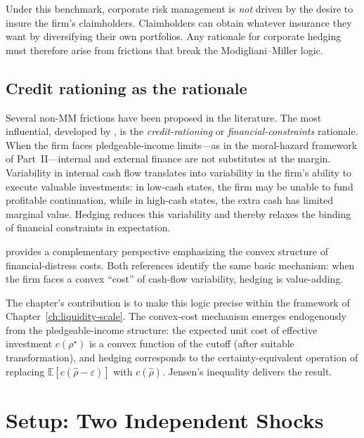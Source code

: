 \documentclass[11pt,a4paper,oneside]{book}
\def\E{\mathbb{E}}
\theoremstyle{plain}
\theoremstyle{definition}
\theoremstyle{remark}
\numberwithin{equation}{chapter}
\begin{document}
Under this benchmark, corporate risk management is \emph{not} driven by the desire to insure the firm's claimholders.
Claimholders can obtain whatever insurance they want by diversifying their own portfolios.
Any rationale for corporate hedging must therefore arise from frictions that break the Modigliani--Miller logic.

\subsection{Credit rationing as the rationale}

Several non-MM frictions have been proposed in the literature.
The most influential, developed by \citet{FrootScharfsteinStein1993}, is the \emph{credit-rationing} or \emph{financial-constraints} rationale.
When the firm faces pledgeable-income limits---as in the moral-hazard framework of Part~II---internal and external finance are not substitutes at the margin.
Variability in internal cash flow translates into variability in the firm's ability to execute valuable investments: in low-cash states, the firm may be unable to fund profitable continuation, while in high-cash states, the extra cash has limited marginal value.
Hedging reduces this variability and thereby relaxes the binding of financial constraints in expectation.

\citet{Stulz1984} provides a complementary perspective emphasizing the convex structure of financial-distress costs.
Both references identify the same basic mechanism: when the firm faces a convex ``cost'' of cash-flow variability, hedging is value-adding.

The chapter's contribution is to make this logic precise within the framework of Chapter~\ref{ch:liquidity-scale}.
The convex-cost mechanism emerges endogenously from the pledgeable-income structure: the expected unit cost of effective investment $c(\rho^\star)$ is a convex function of the cutoff (after suitable transformation), and hedging corresponds to the certainty-equivalent operation of replacing $\E[c(\widehat{\rho} - \varepsilon)]$ with $c(\widehat{\rho})$.
Jensen's inequality delivers the result.

\section{Setup: Two Independent Shocks}
\label{sec:RM-setup}
\end{document}
